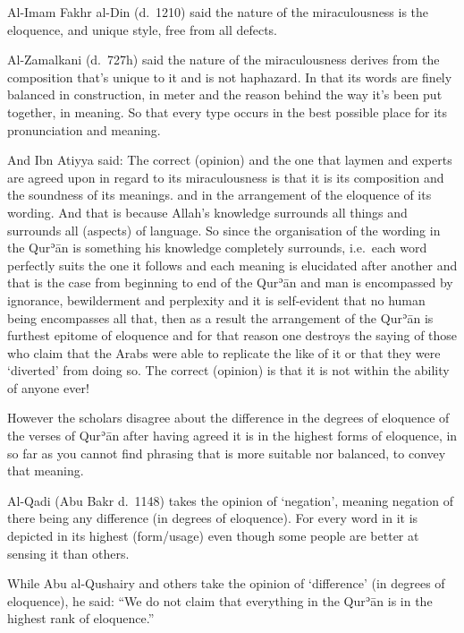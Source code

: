 \documentclass[12pt]{book}
\def \Quran{Qurʾān} %
\def \Qrn{\Quran}   %
\begin{document}

Al-Imam Fakhr al-Din (d.\ 1210) said the nature of the miraculousness is the
eloquence, and unique style, free from all defects.

Al-Zamalkani (d.\ 727h) said the nature of the miraculousness derives from the
composition that’s unique to it and is not haphazard. In that its words are
finely balanced in construction, in meter and the reason behind the way it’s
been put together, in meaning. So that every type occurs in the best possible
place for its pronunciation and meaning.

And Ibn Atiyya said: The correct (opinion) and the one that laymen and experts
are agreed upon in regard to its miraculousness is that it is its composition
and the soundness of its meanings. and in the arrangement of the eloquence of
its wording. And that is because Allah’s knowledge surrounds all things and
surrounds all (aspects) of language. So since the organisation of the wording
in the \Qrn{} is something his knowledge completely surrounds, i.e.\ each word
perfectly suits the one it follows and each meaning is elucidated after another
and that is the case from beginning to end of the \Qrn{} and man is encompassed
by ignorance, bewilderment and perplexity and it is self-evident that no human
being encompasses all that, then as a result the arrangement of the \Qrn{} is
furthest epitome of eloquence and for that reason one destroys the saying of
those who claim that the Arabs were able to replicate the like of it or that
they were ‘diverted’ from doing so. The correct (opinion) is that it is not
within the ability of anyone ever!\footnotemark


However the scholars disagree about the difference in the degrees of eloquence
of the verses of \Qrn{} after having agreed it is in the highest forms of
eloquence, in so far as you cannot find phrasing that is more suitable nor
balanced, to convey that meaning.

Al-Qadi (Abu Bakr d.\ 1148) takes the opinion of ‘negation’, meaning negation
of there being any difference (in degrees of eloquence). For every word in it
is depicted in its highest (form/usage) even though some people are better at
sensing it than others.

While Abu al-Qushairy and others take the opinion of ‘difference’ (in degrees
of eloquence), he said: “We do not claim that everything in the \Qrn{} is in
the highest rank of eloquence.”
\end{document}
